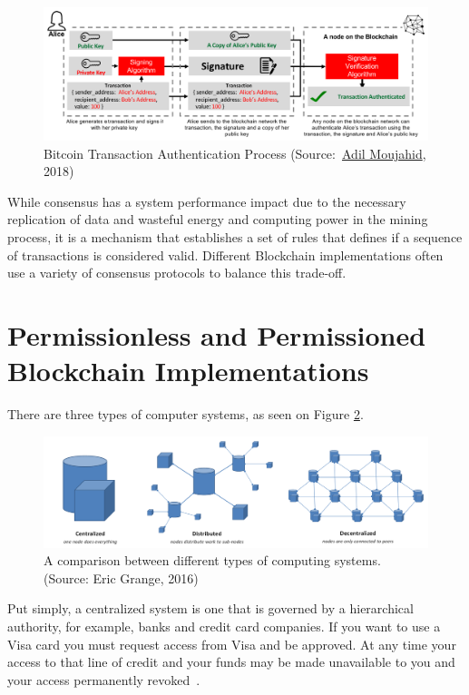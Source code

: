 \begin{figure}[h]
	\centering
	\includegraphics[width=1\linewidth]{imgs/bitcoinTransaction.png}
  \caption{\label{fig:bitcoinTransaction} Bitcoin Transaction Authentication
  Process
  (Source:~\href{http://adilmoujahid.com/images/blockchain-public-crypto.png}{Adil
  Moujahid}, 2018)}
\end{figure}

While consensus has a system performance impact due to the necessary
replication of data and wasteful energy and computing power in the mining
process, it is a mechanism that establishes a set of rules that defines if a
sequence of transactions is considered valid.  Different Blockchain
implementations often use a variety of consensus protocols to balance this
trade-off.

\section{Permissionless and Permissioned Blockchain Implementations}

There are three types of computer systems, as seen on Figure
\ref{fig:typesofnetworks}.

\begin{figure}[h]
	\centering
	\includegraphics[width=1\linewidth]{imgs/typesofnetworks.png}
  \caption{\label{fig:typesofnetworks} A comparison between different types of
  computing systems. (Source: Eric Grange, 2016)}
\end{figure}

Put simply, a centralized system is one that is governed by a hierarchical
authority, for example, banks and credit card companies. If you want to use a
Visa card you must request access from Visa and be approved. At any time your
access to that line of credit and your funds may be made unavailable to you and
your access permanently revoked~\cite{Dreifuerst2018}.

